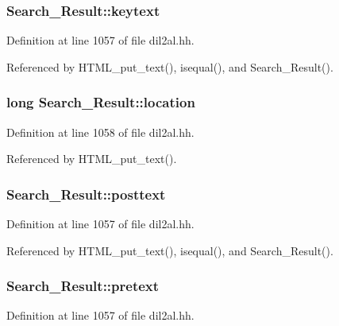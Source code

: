 \subsubsection{ Search\_\-Result::keytext\hspace{0.3cm}{\tt  [protected]}}\label{classSearch__Result_n3}




Definition at line 1057 of file dil2al.hh.

Referenced by HTML\_\-put\_\-text(), isequal(), and Search\_\-Result().
\subsubsection{\setlength{\rightskip}{0pt plus 5cm}long Search\_\-Result::location\hspace{0.3cm}{\tt  [protected]}}\label{classSearch__Result_n5}




Definition at line 1058 of file dil2al.hh.

Referenced by HTML\_\-put\_\-text().
\subsubsection{ Search\_\-Result::posttext\hspace{0.3cm}{\tt  [protected]}}\label{classSearch__Result_n4}




Definition at line 1057 of file dil2al.hh.

Referenced by HTML\_\-put\_\-text(), isequal(), and Search\_\-Result().
\subsubsection{ Search\_\-Result::pretext\hspace{0.3cm}{\tt  [protected]}}\label{classSearch__Result_n2}




Definition at line 1057 of file dil2al.hh.

